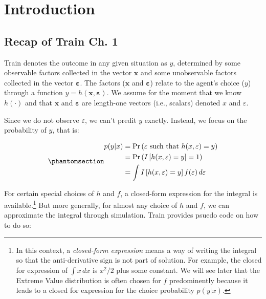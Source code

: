 \documentclass[
  letterpaper,
  DIV=11,
  numbers=noendperiod]{scrreprt}
\begin{document}
\chapter{Introduction}\label{sec-introduction}

\section{Recap of Train Ch. 1}\label{recap-of-train-ch.-1}

Train denotes the outcome in any given situation as \(y\), determined by
some observable factors collected in the vector \(\mathbf{x}\) and some
unobservable factors collected in the vector
\(\boldsymbol{\varepsilon}\). The factors (\(\mathbf{x}\) and
\(\boldsymbol{\varepsilon}\)) relate to the agent's choice (\(y\))
through a function \(y = h(\mathbf{x}, \boldsymbol{\varepsilon})\). We
assume for the moment that we know \(h(\cdot)\) and that \(\mathbf{x}\)
and \(\boldsymbol{\varepsilon}\) are length-one vectors (i.e., scalars)
denoted \(x\) and \(\varepsilon\).

Since we do not observe \(\varepsilon\), we can't predit \(y\) exactly.
Instead, we focus on the probability of \(y\), that is:

\begin{equation}\phantomsection\label{eq-int_indicator}{
\begin{align}
p(y|x) 
&= \Pr \left( \varepsilon \textrm{ such that } h(x,\varepsilon)=y \right) \\
&= \Pr \left( I \left[ h(x,\varepsilon)=y \right] = 1 \right) \\
&= \int I \left[ h(x,\varepsilon)=y \right] f(\varepsilon) \, d\varepsilon
\end{align}
}\end{equation}

For certain special choices of \(h\) and \(f\), a closed-form expression
for the integral is available.\footnote{In this context, a
  \emph{closed-form expression} means a way of writing the integral so
  that the anti-derivative sign is not part of solution. For example,
  the closed for expression of \(\int x \, dx\) is \(x^2/2\) plus some
  constant. We will see later that the Extreme Value distribution is
  often chosen for \(f\) predominently because it leads to a closed for
  expression for the choice probability \(p(y|x)\).} But more generally,
for almost any choice of \(h\) and \(f\), we can approximate the
integral through simulation. Train provides psuedo code on how to do so:
\end{document}
